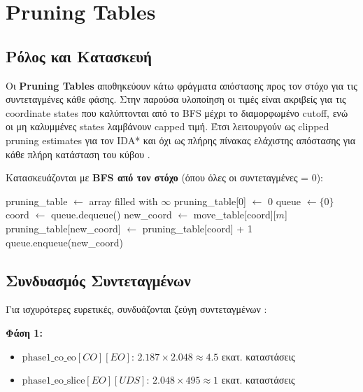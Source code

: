 \section{Pruning Tables}
\label{sec:pruning_tables}

\subsection{Ρόλος και Κατασκευή}

Οι \textbf{Pruning Tables} αποθηκεύουν κάτω φράγματα απόστασης προς τον στόχο για τις συντεταγμένες κάθε φάσης. Στην παρούσα υλοποίηση οι τιμές είναι ακριβείς για τις coordinate states που καλύπτονται από το BFS μέχρι το διαμορφωμένο cutoff, ενώ οι μη καλυμμένες states λαμβάνουν capped τιμή. Έτσι λειτουργούν ως clipped pruning estimates για τον IDA* και όχι ως πλήρης πίνακας ελάχιστης απόστασης για κάθε πλήρη κατάσταση του κύβου \cite{kociemba_twophase_details,korf1985depth}.

Κατασκευάζονται με \textbf{BFS από τον στόχο} (όπου όλες οι συντεταγμένες = 0):

\begin{algorithm}[H]
\caption{Κατασκευή Pruning Table}
\begin{algorithmic}[1]
\State pruning\_table $\gets$ array filled with $\infty$
\State pruning\_table[0] $\gets$ 0 
\State queue $\gets \{0\}$
    \State coord $\gets$ queue.dequeue()
        \State new\_coord $\gets$ move\_table[coord][$m$]
            \State pruning\_table[new\_coord] $\gets$ pruning\_table[coord] + 1
            \State queue.enqueue(new\_coord)
        \EndIf
    \EndFor
\EndWhile
\end{algorithmic}
\end{algorithm}

\subsection{Συνδυασμός Συντεταγμένων}

Για ισχυρότερες ευρετικές, συνδυάζονται ζεύγη συντεταγμένων \cite{kociemba_twophase_details}:

\textbf{Φάση 1:}
\begin{itemize}
    \item $\text{phase1\_co\_eo}[CO][EO]$: $2.187 \times 2.048 \approx 4.5$ εκατ. καταστάσεις
    \item $\text{phase1\_eo\_slice}[EO][UDS]$: $2.048 \times 495 \approx 1$ εκατ. καταστάσεις
\end{itemize}

